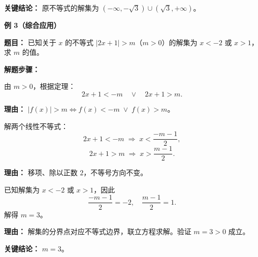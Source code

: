 \begin{examplebox}
	\textbf{\textcolor{CExample}{关键结论：}}
	原不等式的解集为 $(-\infty,-\sqrt{3})\cup(\sqrt{3},+\infty)$。

	\medskip
	\textbf{\textcolor{CExample}{例 3（综合应用）}}

	\textbf{\textcolor{CExample}{题目：}}
	已知关于 $x$ 的不等式 $|2x+1|>m$（$m>0$）的解集为 $x<-2$ 或 $x>1$，求 $m$ 的值。

	\textbf{\textcolor{CExample}{解题步骤：}}
	\begin{description}[style=nextline, leftmargin=2.8em, labelsep=0.5em, itemsep=0.45em]
		\item[\textbf{第一步（套用结论）：}] 由 $m>0$，根据定理：
			\[
				2x+1<-m \quad\lor\quad 2x+1>m.
			\]
			\par\textbf{理由：} $|f(x)|>m\iff f(x)<-m \;\lor\; f(x)>m$。

		\item[\textbf{第二步（解出形式）：}] 解两个线性不等式：
			\[
				2x+1<-m \;\Rightarrow\; x<\frac{-m-1}{2},
			\]
			\[
				2x+1>m \;\Rightarrow\; x>\frac{m-1}{2}.
			\]
			\par\textbf{理由：} 移项、除以正数 $2$，不等号方向不变。

		\item[\textbf{第三步（对比解集）：}] 已知解集为 $x<-2$ 或 $x>1$，因此
			\[
				\frac{-m-1}{2}=-2,\quad \frac{m-1}{2}=1.
			\]
			解得 $m=3$。
			\par\textbf{理由：} 解集的分界点对应不等式边界，联立方程求解。验证 $m=3>0$ 成立。
	\end{description}

	\textbf{\textcolor{CExample}{关键结论：}}
	$m=3$。
\end{examplebox}
